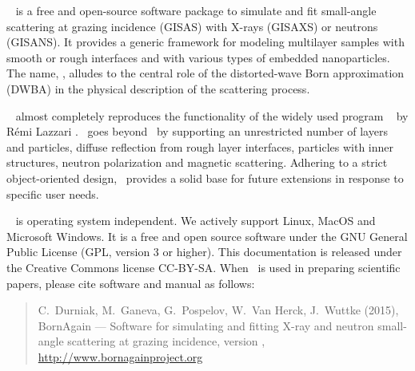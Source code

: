 

\cleardoublepage
{}

\BornAgain\
is a free and open-source software package
to simulate and fit small-angle
scattering at grazing incidence (GISAS)
with X-rays (GISAXS) or neutrons (GISANS).
It provides a generic framework
for modeling multilayer samples with smooth or
rough interfaces and with various types of embedded nanoparticles.
The name, \BornAgain,
alludes to the central role of the distorted-wave Born
approximation (DWBA) in the physical description of the
scattering process.

\BornAgain\
almost completely reproduces the functionality
of the widely used program \IsGISAXS\
\index{Lazzari, R\'emi}
by R\'emi Lazzari \cite{Laz02}.
\BornAgain\ goes beyond \IsGISAXS\ by
supporting an unrestricted number of layers and particles, 
diffuse reflection from rough layer interfaces,
particles with inner structures, neutron polarization and magnetic scattering.
Adhering to a strict object-oriented design,
\BornAgain\ provides a solid base for future extensions
in response to specific user needs.

\BornAgain\
%
%
is operating system independent.
We actively support
Linux,
\index{Linux}%
MacOS
%
and  Microsoft Windows.
%
%
It is a free and open source software under
the GNU General Public License (GPL, version 3 or higher).
This documentation is released under the Creative Commons license CC-BY-SA.
When \BornAgain\ is used in preparing scientific papers,
please cite software and manual as follows:
\index{Citation}%
\begin{quote}
C.~Durniak, M.~Ganeva, G.~Pospelov, W.~Van Herck, J.~Wuttke (2015),\newline
BornAgain --- Software for simulating and fitting
X-ray and neutron small-angle scattering at grazing incidence,
version \UserManualVersionNumber,\newline
\url{http://www.bornagainproject.org}
\end{quote}

